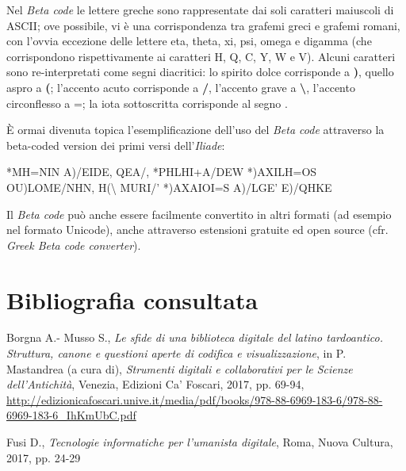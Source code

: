 Nel \emph{Beta code} le lettere greche sono rappresentate dai soli
caratteri maiuscoli di ASCII; ove possibile, vi è una corrispondenza tra
grafemi greci e grafemi romani, con l'ovvia eccezione delle lettere eta,
theta, xi, psi, omega e digamma (che corrispondono rispettivamente ai
caratteri H, Q, C, Y, W e V). Alcuni caratteri sono re-interpretati come
segni diacritici: lo spirito dolce corrisponde a \textbf{)}, quello
aspro a \textbf{(}; l'accento acuto corrisponde a \textbf{/}, l'accento
grave a \textbf{\textbackslash{}}, l'accento circonflesso a =; la iota
sottoscritta corrisponde al segno \textbar{}.

È ormai divenuta topica l'esemplificazione dell'uso del \emph{Beta code}
attraverso la beta-coded version dei primi versi dell'\emph{Iliade}:

*MH=NIN A)/EIDE, QEA/, *PHLHI+A/DEW *)AXILH=OS\\
OU)LOME/NHN, H(\textbackslash{} MURI/' *)AXAIOI=S A)/LGE' E)/QHKE

Il \emph{Beta code} può anche essere facilmente convertito in altri
formati (ad esempio nel formato Unicode), anche attraverso estensioni
gratuite ed open source (cfr. \emph{Greek Beta code converter}).

\section*{Bibliografia consultata}
{\parindent0pt 
Borgna A.- Musso S., \emph{Le sfide di una biblioteca digitale del
latino tardoantico. Struttura, canone e questioni aperte di codifica e
visualizzazione}, in P. Mastandrea (a cura di), \emph{Strumenti digitali
e collaborativi per le Scienze dell'Antichità}, Venezia, Edizioni Ca'
Foscari, 2017, pp. 69-94,
\url{http://edizionicafoscari.unive.it/media/pdf/books/978-88-6969-183-6/978-88-6969-183-6_IhKmUbC.pdf}

Fusi D., \emph{Tecnologie informatiche per l'umanista digitale}, Roma,
Nuova Cultura, 2017, pp. 24-29
}

